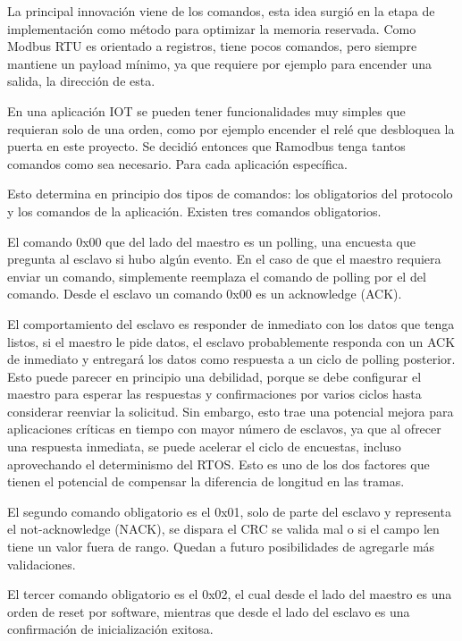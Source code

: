 La principal innovación viene de los comandos, esta idea surgió en la etapa de implementación como método para optimizar la memoria reservada.
Como Modbus RTU es orientado a registros, tiene pocos comandos, pero siempre mantiene un payload mínimo, ya que requiere por ejemplo para encender una salida, la dirección de esta.

En una aplicación IOT se pueden tener funcionalidades muy simples que requieran solo de una orden, como por ejemplo encender el relé que desbloquea la puerta en este proyecto. Se decidió entonces que Ramodbus tenga tantos comandos como sea necesario. Para cada aplicación específica.

Esto determina en principio dos tipos de comandos: los obligatorios del protocolo y los comandos de la aplicación. Existen tres comandos obligatorios.

El comando 0x00 que del lado del maestro es un polling, una encuesta que pregunta al esclavo si hubo algún evento. En el caso de que el maestro requiera enviar un comando, simplemente reemplaza el comando de polling por el del comando. Desde el esclavo un comando 0x00 es un acknowledge (ACK).

El comportamiento del esclavo es responder de inmediato con los datos que tenga listos, si el maestro le pide datos, el esclavo probablemente responda con un ACK de inmediato y entregará los datos como respuesta a un ciclo de polling posterior. Esto puede parecer en principio una debilidad, porque se debe configurar el maestro para esperar las respuestas y confirmaciones por varios ciclos hasta considerar reenviar la solicitud. Sin embargo, esto trae una potencial mejora para aplicaciones críticas en tiempo con mayor número de esclavos, ya que al ofrecer una respuesta inmediata, se puede acelerar el ciclo de encuestas, incluso aprovechando el determinismo del RTOS. Esto es uno de los dos factores que tienen el potencial de compensar la diferencia de longitud en las tramas.

El segundo comando obligatorio es el 0x01, solo de parte del esclavo y representa el not-acknowledge (NACK), se dispara el  CRC se valida mal o si el campo len tiene un valor fuera de rango. Quedan a futuro posibilidades de agregarle más validaciones.

El tercer comando obligatorio es el 0x02, el cual desde el lado del maestro es una orden de reset por software, mientras que desde el lado del esclavo es una confirmación de inicialización exitosa. 


